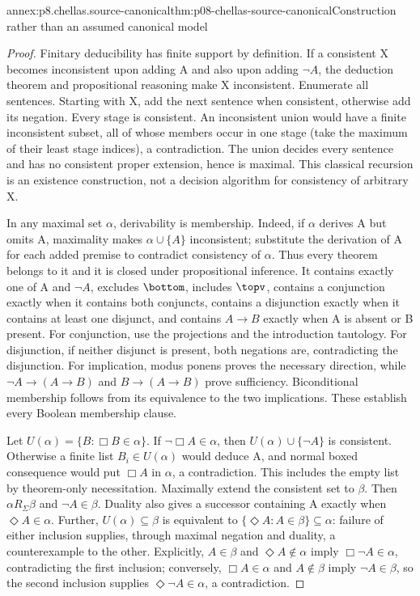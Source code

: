 \begin{annexitem}{annex:p8.chellas.source-canonical}{thm:p08-chellas-source-canonical}{Construction rather than an assumed canonical model}
\begin{proof}
Finitary deducibility has finite support by definition. If a consistent
X becomes inconsistent upon adding A and also upon adding \(\neg A\),
the deduction theorem and propositional reasoning make X inconsistent.
Enumerate all sentences. Starting with X, add the next sentence when
consistent, otherwise add its negation. Every stage is consistent.
An inconsistent union would have a finite inconsistent subset, all of
whose members occur in one stage (take the maximum of their least
stage indices), a contradiction. The union decides every sentence
and has no consistent proper extension, hence is maximal. This
classical recursion is an existence construction, not a decision
algorithm for consistency of arbitrary X.

In any maximal set \(\alpha\), derivability is membership. Indeed,
if \(\alpha\) derives A but omits A, maximality makes
\(\alpha\cup\{A\}\) inconsistent; substitute the derivation of A
for each added premise to contradict consistency of \(\alpha\).
Thus every theorem belongs to it and it is closed under propositional
inference. It contains exactly one of A and \(\neg A\), excludes
\(\bottom\), includes \(\topv\), contains a conjunction exactly
when it contains both conjuncts, contains a disjunction exactly when
it contains at least one disjunct, and contains \(A\to B\) exactly
when A is absent or B present. For conjunction, use the projections
and the introduction tautology. For disjunction, if neither disjunct
is present, both negations are, contradicting the disjunction. For
implication, modus ponens proves the necessary direction, while
\(\neg A\to(A\to B)\) and \(B\to(A\to B)\) prove sufficiency.
Biconditional membership follows from its equivalence to the two
implications. These establish every Boolean membership clause.

Let \(U(\alpha)=\{B:\Box B\in\alpha\}\). If
\(\neg\Box A\in\alpha\), then
\(U(\alpha)\cup\{\neg A\}\) is consistent. Otherwise a finite
list \(B_i\in U(\alpha)\) would deduce A, and normal boxed
consequence would put \(\Box A\) in \(\alpha\), a contradiction.
This includes the empty list by theorem-only necessitation.
Maximally extend the consistent set to \(\beta\). Then
\(\alpha R_\Sigma\beta\) and \(\neg A\in\beta\).
Duality also gives a successor containing A exactly when
\(\Diamond A\in\alpha\). Further,
\(U(\alpha)\subseteq\beta\) is equivalent to
\(\{\Diamond A:A\in\beta\}\subseteq\alpha\): failure of
either inclusion supplies, through maximal negation and duality,
a counterexample to the other. Explicitly, \(A\in\beta\) and
\(\Diamond A\notin\alpha\) imply \(\Box\neg A\in\alpha\),
contradicting the first inclusion; conversely, \(\Box A\in\alpha\)
and \(A\notin\beta\) imply \(\neg A\in\beta\), so the second
inclusion supplies \(\Diamond\neg A\in\alpha\), a contradiction.


\end{proof}
\end{annexitem}
